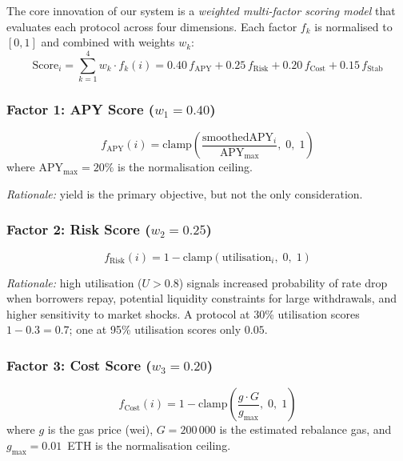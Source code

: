 \documentclass[12pt]{article}
\begin{document}
The core innovation of our system is a \emph{weighted multi-factor scoring model} that evaluates each protocol across four dimensions.
Each factor $f_k$ is normalised to $[0, 1]$ and combined with weights $w_k$:
\begin{equation}
  \text{Score}_i = \sum_{k=1}^{4} w_k \cdot f_k(i) = 0.40\,f_{\text{APY}} + 0.25\,f_{\text{Risk}} + 0.20\,f_{\text{Cost}} + 0.15\,f_{\text{Stab}}
  \label{eq:mcdm}
\end{equation}

\subsubsection{Factor 1: APY Score ($w_1 = 0.40$)}

\begin{equation}
  f_{\text{APY}}(i) = \text{clamp}\!\left(\frac{\text{smoothedAPY}_i}{\text{APY}_{\max}},\; 0,\; 1\right)
  \label{eq:f-apy}
\end{equation}
where $\text{APY}_{\max} = 20\%$ is the normalisation ceiling.

\emph{Rationale:} yield is the primary objective, but not the only consideration.

\subsubsection{Factor 2: Risk Score ($w_2 = 0.25$)}

\begin{equation}
  f_{\text{Risk}}(i) = 1 - \text{clamp}(\text{utilisation}_i,\; 0,\; 1)
  \label{eq:f-risk}
\end{equation}

\emph{Rationale:} high utilisation ($U > 0.8$) signals increased probability of rate drop when borrowers repay, potential liquidity constraints for large withdrawals, and higher sensitivity to market shocks.
A protocol at 30\% utilisation scores $1 - 0.3 = 0.7$; one at 95\% utilisation scores only $0.05$.

\subsubsection{Factor 3: Cost Score ($w_3 = 0.20$)}

\begin{equation}
  f_{\text{Cost}}(i) = 1 - \text{clamp}\!\left(\frac{g \cdot G}{g_{\max}},\; 0,\; 1\right)
  \label{eq:f-cost}
\end{equation}
where $g$ is the gas price (wei), $G = 200\,000$ is the estimated rebalance gas, and $g_{\max} = 0.01$~ETH is the normalisation ceiling.
\end{document}
